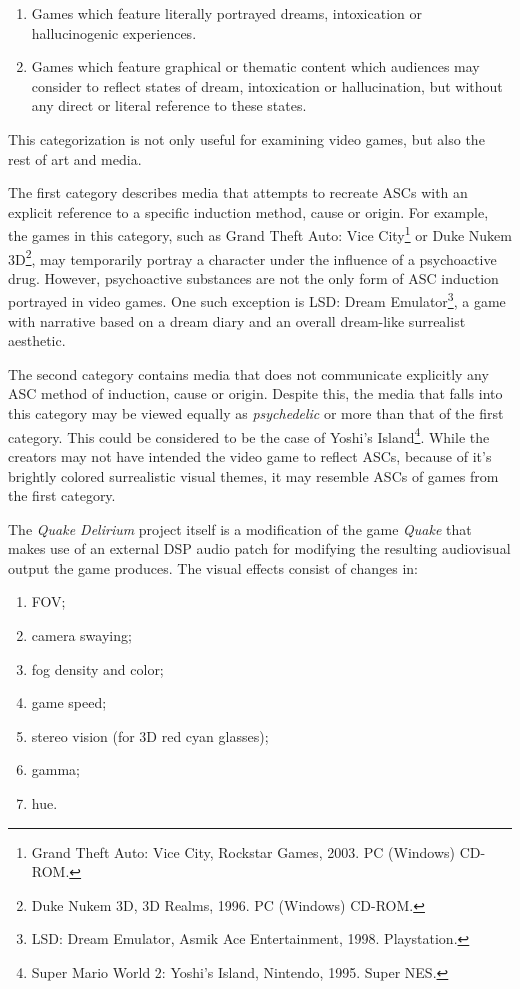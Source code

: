\begin{enumerate}
    \item Games which feature literally portrayed dreams, intoxication or hallucinogenic experiences.
    \item Games which feature graphical or thematic content which audiences may consider to reflect states of dream, intoxication or hallucination, but without any direct or literal reference to these states.
\end{enumerate}

This categorization is not only useful for examining video games, but also the rest of art and media.

The first category describes media that attempts to recreate \acp{ASC} with an explicit reference to a specific induction method, cause or origin. For example, the games in this category, such as {Grand Theft Auto: Vice City}\footnote{Grand Theft Auto: Vice City, Rockstar Games, 2003. PC (Windows) CD-ROM.} or {Duke Nukem 3D}\footnote{Duke Nukem 3D, 3D Realms, 1996. PC (Windows)
CD-ROM.}, may temporarily portray a character under the influence of a psychoactive drug. However, psychoactive substances are not the only form of \ac{ASC} induction portrayed in video games. One such exception is {LSD: Dream Emulator}\footnote{LSD: Dream Emulator, Asmik Ace Entertainment, 1998. Playstation.}, a game with narrative based on a dream diary and an overall dream-like surrealist aesthetic.

The second category contains media that does not communicate explicitly any \ac{ASC} method of induction, cause or origin. Despite this, the media that falls into this category may be viewed equally as \textit{psychedelic} or more than that of the first category. This could be considered to be the case of {Yoshi's Island}\footnote{Super Mario World 2: Yoshi’s Island, Nintendo, 1995. Super NES.}. While the creators may not have intended the video game to reflect \acp{ASC}, because of it's brightly colored surrealistic visual themes, it may resemble \acp{ASC} of games from the first category.

The \textit{Quake Delirium} project itself is a modification of the game \textit{Quake} that makes use of an external \ac{DSP} audio patch for modifying the resulting audiovisual output the game produces. The visual effects consist of changes in:

\begin{enumerate}
    \setlength{\itemsep}{0pt}
    \setlength{\parskip}{0pt}
    \item \ac{FOV};
    \item camera swaying;
    \item fog density and color;
    \item game speed;
    \item stereo vision (for 3D red cyan glasses);
    \item gamma;
    \item hue.
\end{enumerate}

